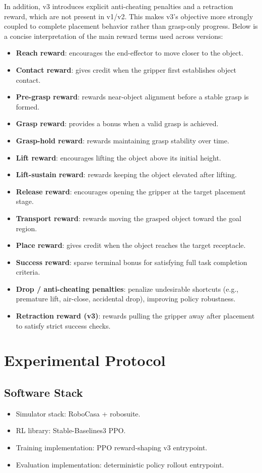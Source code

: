 \documentclass[11pt]{article}
\begin{document}
In addition, v3 introduces explicit anti-cheating penalties and a retraction
reward, which are not present in v1/v2. This makes v3's objective more strongly
coupled to complete placement behavior rather than grasp-only progress. Below is a
concise interpretation of the main reward terms used across versions:

\begin{itemize}
  \item \textbf{Reach reward}: encourages the end-effector to move closer to the object.
  \item \textbf{Contact reward}: gives credit when the gripper first establishes object contact.
  \item \textbf{Pre-grasp reward}: rewards near-object alignment before a stable grasp is formed.
  \item \textbf{Grasp reward}: provides a bonus when a valid grasp is achieved.
  \item \textbf{Grasp-hold reward}: rewards maintaining grasp stability over time.
  \item \textbf{Lift reward}: encourages lifting the object above its initial height.
  \item \textbf{Lift-sustain reward}: rewards keeping the object elevated after lifting.
  \item \textbf{Release reward}: encourages opening the gripper at the target placement stage.
  \item \textbf{Transport reward}: rewards moving the grasped object toward the goal region.
  \item \textbf{Place reward}: gives credit when the object reaches the target receptacle.
  \item \textbf{Success reward}: sparse terminal bonus for satisfying full task completion criteria.
  \item \textbf{Drop / anti-cheating penalties}: penalize undesirable shortcuts (e.g., premature lift, air-close, accidental drop), improving policy robustness.
  \item \textbf{Retraction reward (v3)}: rewards pulling the gripper away after placement to satisfy strict success checks.
\end{itemize}

\section{Experimental Protocol}

\subsection{Software Stack}
\begin{itemize}
  \item Simulator stack: RoboCasa + robosuite.
  \item RL library: Stable-Baselines3 PPO.
  \item Training implementation: PPO reward-shaping v3 entrypoint.
  \item Evaluation implementation: deterministic policy rollout entrypoint.
\end{itemize}
\end{document}
